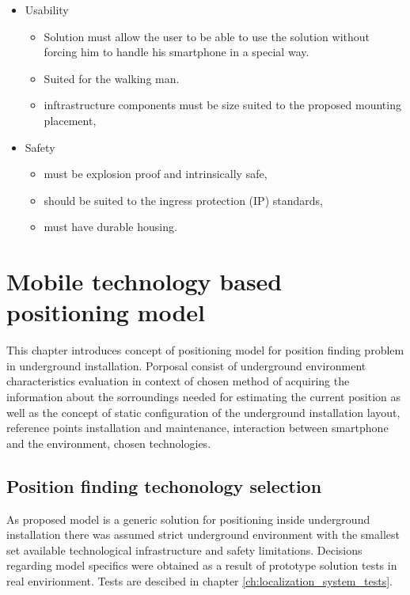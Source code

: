 \documentclass[../main.tex]{subfiles}
\begin{document}
\begin{itemize}
\begin{itemize}
	\end{itemize}
	\item Usability
	\begin{itemize}
		\item Solution must allow the user to be able to use the solution without forcing him to handle his smartphone in a special way.
		\item Suited for the walking man.
		\item inftrastructure components must be size suited to the proposed mounting placement,
	\end{itemize}
	\item Safety
	\begin{itemize}
		\item must be explosion proof and intrinsically safe,
		\item should be suited to the ingress protection (IP) standards,
		\item must have durable housing.
	\end{itemize}
\end{itemize}



\chapter{Mobile technology based positioning model}
This chapter introduces concept of positioning model for position finding problem in underground installation. Porposal consist of underground environment characteristics evaluation in context of chosen method of acquiring the information about the sorroundings needed for estimating the current position as well as the concept of static configuration of the underground installation layout, reference points installation and maintenance, interaction between smartphone and the environment, chosen technologies.

\section{Position finding techonology selection} %
\label{sec:position_finding_requirements}

As proposed model is a generic solution for positioning inside underground installation there was assumed strict underground environment with the smallest set available technological infrastructure and safety limitations. Decisions regarding model specifics were obtained as a result of prototype solution tests in real envirionment. Tests are descibed in chapter \ref{ch:localization_system_tests}.
\end{document}
